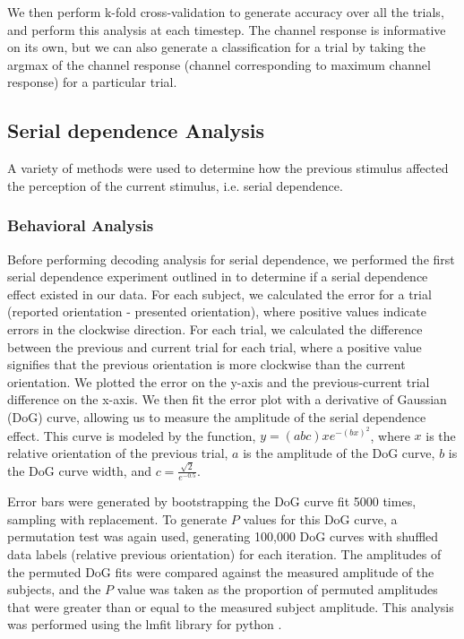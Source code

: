 \documentclass[../main.tex]{subfiles}
\begin{document}
We then perform k-fold cross-validation to generate accuracy over all the trials, and perform this analysis at each timestep. The channel response is informative on its own, but we can also generate a classification for a trial by taking the argmax of the channel response (channel corresponding to maximum channel response) for a particular trial.

\subsection{Serial dependence Analysis}
A variety of methods were used to determine how the previous stimulus affected the perception of the current stimulus, i.e. serial dependence. 

\subsubsection{Behavioral Analysis}
Before performing decoding analysis for serial dependence, we performed the first serial dependence experiment outlined in \cite{fischer_whitney_2014} to determine if a serial dependence effect existed in our data. For each subject, we calculated the error for a trial (reported orientation - presented orientation), where positive values indicate errors in the clockwise direction. For each trial, we calculated the difference between the previous and current trial for each trial, where a positive value signifies that the previous orientation is more clockwise than the current orientation. We plotted the error on the y-axis and the previous-current trial difference on the x-axis. We then fit the error plot with a derivative of Gaussian (DoG) curve, allowing us to measure the amplitude of the serial dependence effect. This curve is modeled by the function, $y = (a b c) x e^{-(b x)^2}$, where $x$ is the relative orientation of the previous trial, $a$ is the amplitude of the DoG curve, $b$ is the DoG curve width, and
$c = \frac{\sqrt{2}}{e^{-0.5}}$.

Error bars were generated by bootstrapping the DoG curve fit 5000 times, sampling with replacement. To generate $P$ values for this DoG curve, a permutation test was again used, generating 100,000 DoG curves with shuffled data labels (relative previous orientation) for each iteration. The amplitudes of the permuted DoG fits were compared against the measured amplitude of the subjects, and the $P$ value was taken as the proportion of permuted amplitudes that were greater than or equal to the measured subject amplitude. This analysis was performed using the lmfit library for python \citep{newville_matthew_2014_11813}.
\end{document}

